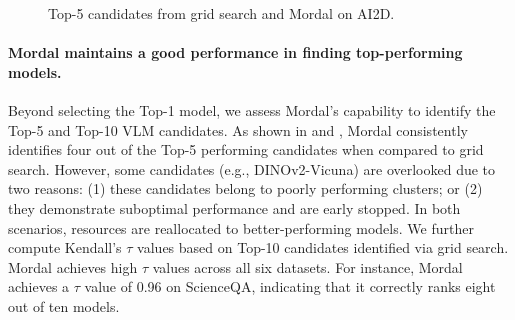 




\begin{figure}[!t]
\centering
\caption{Top-5 candidates from grid search and Mordal on AI2D. 
}
\vspace{-4mm}
\label{fig:rank_AI2D}
\end{figure}

\paragraph{Mordal maintains a good performance in finding top-performing models.} 
Beyond selecting the Top-1 model, we assess Mordal's capability to identify the Top-5 and Top-10 VLM candidates. As shown in  and , Mordal consistently identifies four out of the Top-5 performing candidates when compared to grid search. However, some candidates (e.g., DINOv2-Vicuna) are overlooked due to two reasons: (1) these candidates belong to poorly performing clusters; or (2) they demonstrate suboptimal performance and are early stopped. In both scenarios, resources are reallocated to better-performing models. We further compute Kendall's $\tau$ values based on Top-10 candidates identified via grid search. Mordal achieves high $\tau$ values across all six datasets. For instance, Mordal achieves a $\tau$ value of 0.96 on ScienceQA, indicating that it correctly ranks eight out of ten models. 


